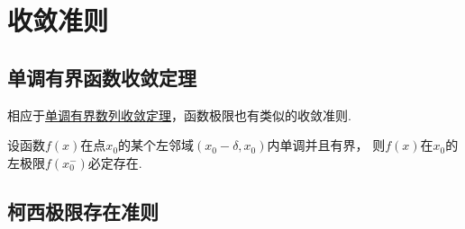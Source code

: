 \section{收敛准则}
\subsection{单调有界函数收敛定理}
相应于\hyperref[theorem:极限.数列的单调有界定理]{单调有界数列收敛定理}，函数极限也有类似的收敛准则.
\begin{theorem}\label{theorem:极限.函数的单调有界定理}
设函数\(f(x)\)在点\(x_0\)的某个左邻域\((x_0-\delta,x_0)\)内单调并且有界，
则\(f(x)\)在\(x_0\)的左极限\(f(x_0^-)\)必定存在.
\end{theorem}

\subsection{柯西极限存在准则}

